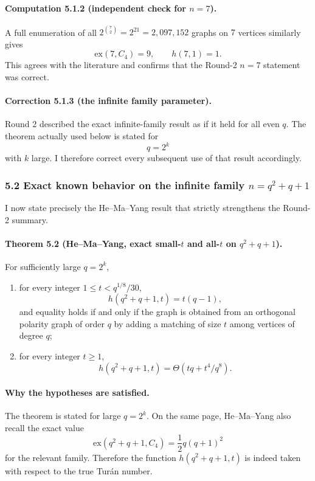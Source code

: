 \paragraph{Computation 5.1.2 (independent check for $n=7$).}
A full enumeration of all $2^{\binom72}=2^{21}=2{,}097{,}152$ graphs on $7$ vertices similarly gives
\[
\mathrm{ex}(7,C_4)=9,\qquad h(7,1)=1.
\]
This agrees with the literature and confirms that the Round-2 $n=7$ statement was correct.

\paragraph{Correction 5.1.3 (the infinite family parameter).}
Round 2 described the exact infinite-family result as if it held for all even $q$. The theorem actually used below is stated for
\[
q=2^k
\]
with $k$ large. I therefore correct every subsequent use of that result accordingly.

\subsubsection*{5.2 Exact known behavior on the infinite family $n=q^2+q+1$}

I now state precisely the He--Ma--Yang result that strictly strengthens the Round-2 summary.

\paragraph{Theorem 5.2 (He--Ma--Yang, exact small-$t$ and all-$t$ on $q^2+q+1$).}
For sufficiently large $q=2^k$,
\begin{enumerate}
\item for every integer $1\le t<q^{1/8}/30$,
\[
h(q^2+q+1,t)=t(q-1),
\]
and equality holds if and only if the graph is obtained from an orthogonal polarity graph of order $q$ by adding a matching of size $t$ among vertices of degree $q$;
\item for every integer $t\ge 1$,
\[
h(q^2+q+1,t)=\Theta(tq+t^4/q^8).
\]
\end{enumerate}

\paragraph{Why the hypotheses are satisfied.}
The theorem is stated for large $q=2^k$. On the same page, He--Ma--Yang also recall the exact value
\[
\mathrm{ex}(q^2+q+1,C_4)=\frac12 q(q+1)^2
\]
for the relevant family. Therefore the function $h(q^2+q+1,t)$ is indeed taken with respect to the true Tur\'an number.


